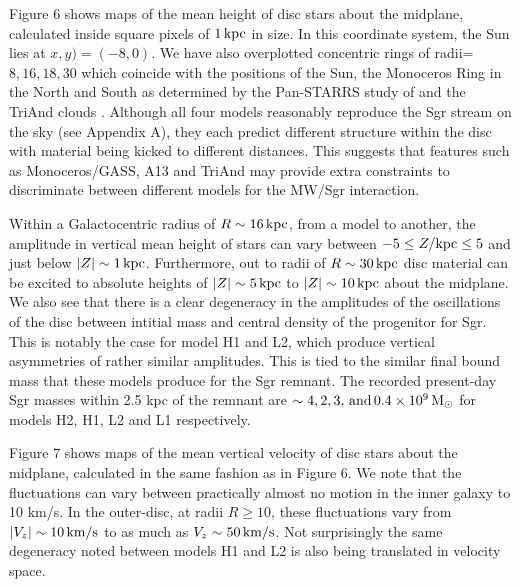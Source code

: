 \documentclass[useAMS,usenatbib]{mnras}
\begin{document}
Figure 6 shows maps of the mean height of disc stars about the midplane, calculated inside square pixels of $1 \,\rm{kpc}$ in size. In this coordinate system, the Sun lies at $x,y)=(-8,0)$. We have also overplotted concentric rings of radii=$8,16,18,30$ which coincide with the positions of the Sun, the Monoceros Ring in the North and South as determined by the Pan-STARRS study of \cite{morganson16} and the TriAnd clouds \citep{sheffield14,price-whelan15}. Although all four models reasonably reproduce the Sgr stream on the sky (see Appendix A), they each predict different structure within the disc with material being kicked to different distances. This suggests that features such as Monoceros/GASS, A13 and TriAnd may provide extra constraints to discriminate between different models for the MW/Sgr interaction. 


Within a Galactocentric radius of $R\sim 16 \,\rm{kpc}$, from a model to another, the amplitude in vertical mean height of stars can vary between $-5 \leq Z/\rm{kpc} \leq 5$ and just below $|Z|\sim1\,\rm{kpc}$. Furthermore, out to radii of $R\sim30\,\rm{kpc}$ disc material can be excited to absolute heights of $|Z|\sim5\,\rm{kpc}$ to $|Z|\sim10\,\rm{kpc}$ about the midplane. We also see that there is a clear degeneracy in the amplitudes of the oscillations of the disc between intitial mass and central density of the progenitor for Sgr.  This is notably the case for model H1 and L2, which produce vertical asymmetries of rather similar amplitudes. This is tied to the similar final bound mass that these models produce for the Sgr remnant. The recorded present-day Sgr masses within 2.5 kpc of the remnant are $\sim4, 2, 3, \,\rm{and}\, 0.4\times10^{9} \,\rm{M_{\odot}}$ for models H2, H1, L2 and L1 respectively.

Figure 7 shows maps of the mean vertical velocity of disc stars about the midplane, calculated in the same fashion as in Figure 6. We note that the fluctuations can vary between practically  almost no motion in the inner galaxy to 10 km/s. In the outer-disc, at radii $R\ge10$, these fluctuations vary from $|V_{z}|\sim10\,\rm{km/s}$ to as much as $V_{z}\sim50\,\rm{km/s}$. Not surprisingly the same degeneracy noted between models H1 and L2 is also being translated in velocity space. 
\end{document}
